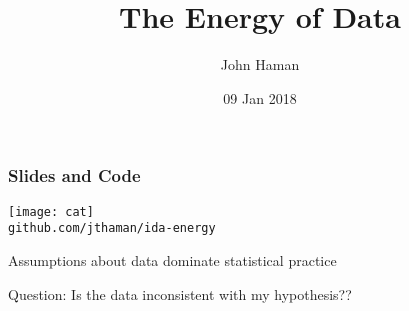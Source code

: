 \documentclass[presentation]{beamer}
\author{John Haman}
\institute{Bowling Green State University, Institute for Defense Analyses}
\date{09 Jan 2018}
\title{The Energy of Data}
\begin{document}
\maketitle

\begin{frame}
  \frametitle{Slides and Code}
  \centering
  \texttt{[image: cat]}\\
  \centering
  \texttt{github.com/jthaman/ida-energy}
\end{frame}

\begin{frame}
  Assumptions about data dominate statistical practice
  \begin{block}{Question:}
    Is the data inconsistent with my hypothesis??
  \end{block}
\end{frame}
\end{document}
